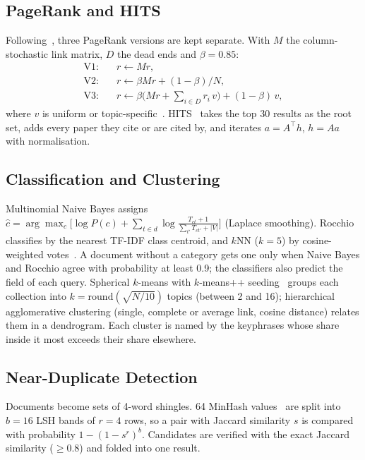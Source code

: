 \documentclass[conference]{IEEEtran}
\begin{document}
\subsection{PageRank and HITS}
Following~\cite{leskovec2020}, three PageRank versions are kept separate. With $M$ the column-stochastic link matrix, $D$ the dead ends and $\beta=0.85$:
\begin{align}
\text{V1:}\quad & r \leftarrow M r,\\
\text{V2:}\quad & r \leftarrow \beta M r + (1-\beta)/N,\\
\text{V3:}\quad & r \leftarrow \beta\big(M r + \textstyle\sum_{i\in D} r_i\, v\big) + (1-\beta)\,v,
\end{align}
where $v$ is uniform or topic-specific~\cite{haveliwala2002}. HITS~\cite{kleinberg1999} takes the top 30 results as the root set, adds every paper they cite or are cited by, and iterates $a=A^{\top}h$, $h=Aa$ with normalisation.

\subsection{Classification and Clustering}
Multinomial Naive Bayes assigns $\hat c=\arg\max_c\big[\log P(c)+\sum_{t\in d}\log\frac{T_{ct}+1}{\sum_{t'}T_{ct'}+|V|}\big]$ (Laplace smoothing). Rocchio classifies by the nearest TF-IDF class centroid, and $k$NN ($k=5$) by cosine-weighted votes~\cite{manning2008}. A document without a category gets one only when Naive Bayes and Rocchio agree with probability at least 0.9; the classifiers also predict the field of each query. Spherical $k$-means with $k$-means++ seeding~\cite{arthur2007} groups each collection into $k=\mathrm{round}(\sqrt{N/10})$ topics (between 2 and 16); hierarchical agglomerative clustering (single, complete or average link, cosine distance) relates them in a dendrogram. Each cluster is named by the keyphrases whose share inside it most exceeds their share elsewhere.

\subsection{Near-Duplicate Detection}
Documents become sets of 4-word shingles. 64 MinHash values~\cite{broder1997} are split into $b=16$ LSH bands of $r=4$ rows, so a pair with Jaccard similarity $s$ is compared with probability $1-(1-s^r)^b$. Candidates are verified with the exact Jaccard similarity ($\geq 0.8$) and folded into one result.
\end{document}
